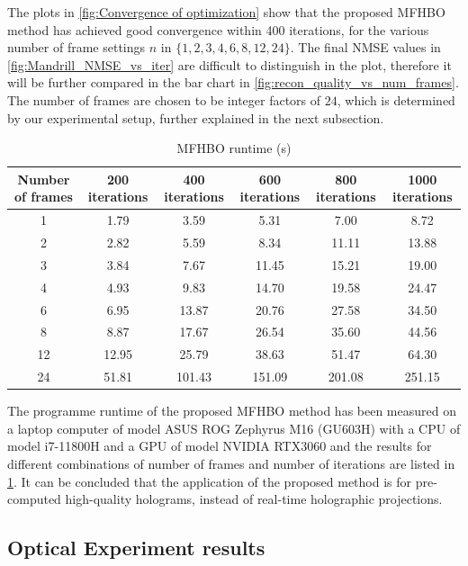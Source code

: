 	The plots in \cref{fig:Convergence of optimization} show that the proposed MFHBO method has achieved good convergence within 400 iterations, for the various number of frame settings $n$ in $\{1, 2, 3, 4, 6, 8, 12, 24\}$. The final NMSE values in \cref{fig:Mandrill_NMSE_vs_iter} are difficult to distinguish in the plot, therefore it will be further compared in the bar chart in \cref{fig:recon_quality_vs_num_frames}. The number of frames are chosen to be integer factors of $24$, which is determined by our experimental setup, further explained in the next subsection.
	
	
	\begin{table}[H]
	\centering
	\begin{tabular}{|c|c|c|c|c|c|}
	\hline
	\textbf{Number of frames} & \textbf{200 iterations} & \textbf{400 iterations} & \textbf{600 iterations} & \textbf{800 iterations} & \textbf{1000 iterations} \\ \hline
	1 & 1.79 & 3.59 & 5.31 & 7.00 & 8.72 \\ \hline
	2 & 2.82 & 5.59 & 8.34 & 11.11 & 13.88 \\ \hline
	3 & 3.84 & 7.67 & 11.45 & 15.21 & 19.00 \\ \hline
	4 & 4.93 & 9.83 & 14.70 & 19.58 & 24.47 \\ \hline
	6 & 6.95 & 13.87 & 20.76 & 27.58 & 34.50 \\ \hline
	8 & 8.87 & 17.67 & 26.54 & 35.60 & 44.56 \\ \hline
	12 & 12.95 & 25.79 & 38.63 & 51.47 & 64.30 \\ \hline
	24 & 51.81 & 101.43 & 151.09 & 201.08 & 251.15 \\ \hline
	\end{tabular}
	\caption{MFHBO runtime (s)}
	\label{tab:MFHBO runtime}
	\end{table}
	
	The programme runtime of the proposed MFHBO method has been measured on a laptop computer of model ASUS ROG Zephyrus M16 (GU603H) with a CPU of model i7-11800H and a GPU of model NVIDIA RTX3060 and the results for different combinations of number of frames and number of iterations are listed in \cref{tab:MFHBO runtime}. It can be concluded that the application of the proposed method is for pre-computed high-quality holograms, instead of real-time holographic projections.
	
	
	
\subsection{Optical Experiment results}
	
